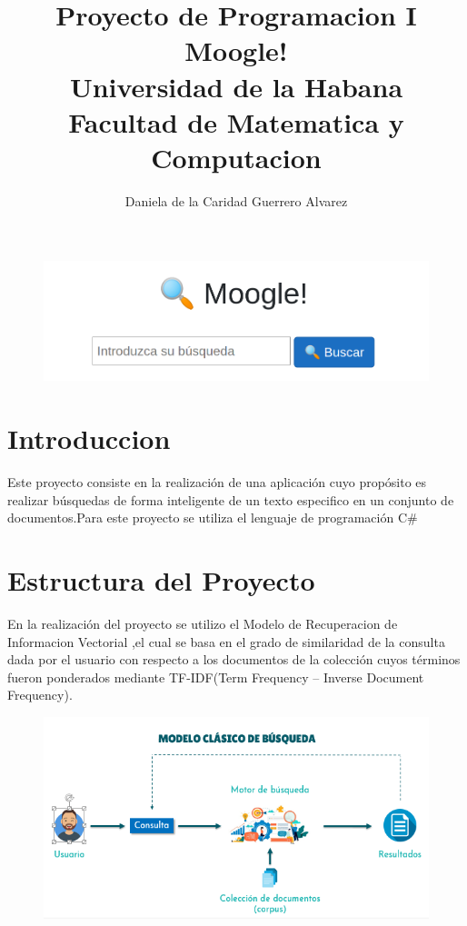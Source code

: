 \documentclass[12 pts,spanish]{article}
\begin{document}
\title{Proyecto de Programacion I  Moogle!\\Universidad de la Habana \\ Facultad de Matematica y Computacion}
\author{Daniela de la Caridad Guerrero Alvarez}
\maketitle


\begin{figure}[ht]
    \centering
    \includegraphics[width=5in]{moogle.png}
    \caption{}
    \label{fig:Moogle}
\end{figure}
\section{Introduccion}
Este proyecto consiste en la realización de una aplicación cuyo propósito es realizar búsquedas de forma inteligente de un texto especifico en un conjunto de documentos.Para este proyecto se utiliza el lenguaje de programación C\#

\section{Estructura del Proyecto}
En la realización del proyecto se utilizo el Modelo de Recuperacion de Informacion Vectorial ,el cual se basa en el grado de similaridad de la consulta dada por el usuario con respecto a los documentos de la colección cuyos términos fueron ponderados mediante TF-IDF(Term Frequency – Inverse Document Frequency).\\ 
\begin{figure}[h]
    \center
    \includegraphics[width=6in]{estructura.png}
    \caption{}
    \label{fig:Estructura del Proyecto}
\end{figure}
\end{document}

